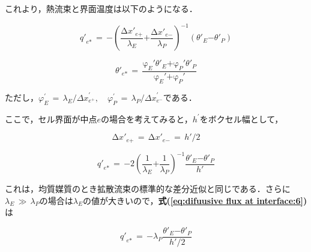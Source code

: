 これより，熱流束と界面温度は以下のようになる．

\begin{equation}
{{q}'}_{e\mathrm{*}}\,=\,\mathrm{{-}}{\left({\frac{\mathrm{\Delta}{{x}'}_{{e}\mathrm{{+}}}}{{{\mathit{\lambda}}_{E}}}\mathrm{{+}}\frac{\mathrm{\Delta}{{x}'}_{{e}\mathrm{{-}}}}{{{\mathit{\lambda}}_{P}}}}\right)}^{\mathrm{{-}}{1}}\left({{{\mathit{\theta}}'}_{E}\mathrm{{-}}{{\mathit{\theta}}'}_{P}}\right)
\label{eq:difuusive flux at interface:3}
\end{equation}

\begin{equation}
{{\mathit{\theta}}'}_{e\mathrm{*}}\,=\,\frac{{{\mathrm{\varphi}}_{E}}'{{\mathit{\theta}}'}_{E}\mathrm{{+}}{{\mathrm{\varphi}}_{P}}'{{\mathit{\theta}}'}_{P}}{{{\mathrm{\varphi}}_{E}}'\mathrm{{+}}{{\mathrm{\varphi}}_{P}}'}
\label{eq:difuusive flux at interface:4}
\end{equation}

ただし，${\varphi}_{E}^{\prime}\,=\,{\lambda}_{E}/{\Delta x}_{e^{+}}^{\prime},\quad{\varphi}_{P}^{\prime}\,=\,{\lambda}_{P}/{\Delta x}_{e^{-}}^{\prime}$である．

ここで，セル界面が中点$e$の場合を考えてみると，$h^{\prime}$をボクセル幅として，

\begin{equation}
\mathrm{\Delta}{{x}'}_{{e}\mathrm{{+}}}\,=\,\mathrm{\Delta}{{x}'}_{{e}\mathrm{{-}}}\,=\,{h}'/2
\label{eq:difuusive flux at interface:5}
\end{equation}

\begin{equation}
{{q}'}_{e\mathrm{*}}\,=\,\mathrm{{-}}{2}{\left({\frac{1}{{{\mathit{\lambda}}_{E}}}\mathrm{{+}}\frac{1}{{{\mathit{\lambda}}_{P}}}}\right)}^{\mathrm{{-}}{1}}\frac{{{\mathit{\theta}}'}_{E}\mathrm{{-}}{{\mathit{\theta}}'}_{P}}{{h}'}
\label{eq:difuusive flux at interface:6}
\end{equation}

これは，均質媒質のとき拡散流束の標準的な差分近似と同じである．さらに$\lambda_{E}\, \gg \, \lambda_{P}$の場合は$\lambda_{E}$の値が大きいので，\textbf{式(\ref{eq:difuusive flux at interface:6})}は

\begin{equation}
{{q}'}_{e\mathrm{*}}\,=\,\mathrm{{-}}{{\mathit{\lambda}}_{P}}\frac{{{\mathit{\theta}}'}_{E}\mathrm{{-}}{{\mathit{\theta}}'}_{P}}{{{h}'}\slash{2}}
\label{eq:difuusive flux at interface:7}
\end{equation}


